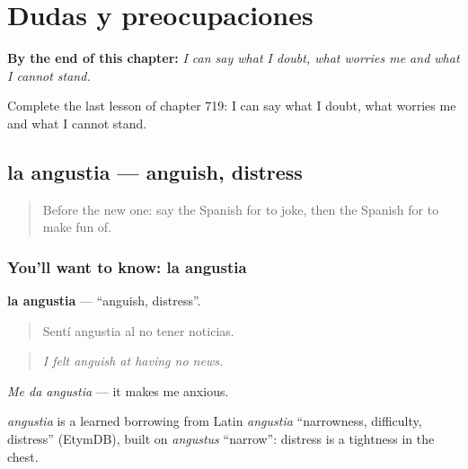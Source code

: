 
\chapter{Dudas y preocupaciones}
\label{ch:es-dudas-y-preocupaciones}

\begin{chapteropening}
\textbf{By the end of this chapter:} \emph{I can say what I doubt, what worries me and what I cannot stand.}

Complete the last lesson of chapter 719: I can say what I doubt, what worries me and what I cannot stand.
\end{chapteropening}

\section[la angustia]{la angustia — anguish, distress}

\label{lesson:ES-C719-angustia}



\begin{quote}
Before the new one: say the Spanish for to joke, then the Spanish for to make fun of.
\end{quote}

\subsection*{You'll want to know: la angustia}
\textbf{la angustia} — \textquotedblleft{}anguish, distress\textquotedblright{}.

\begin{quote}
Sentí angustia al no tener noticias.
\end{quote}

\begin{quote}
\emph{I felt anguish at having no news.}
\end{quote}

\emph{Me da angustia} — it makes me anxious.

\begin{cousinweb}
\emph{angustia} is a learned borrowing from Latin \emph{angustia} \textquotedblleft{}narrowness, difficulty, distress\textquotedblright{} (EtymDB), built on \emph{angustus} \textquotedblleft{}narrow\textquotedblright{}: distress is a tightness in the chest.
\end{cousinweb}

